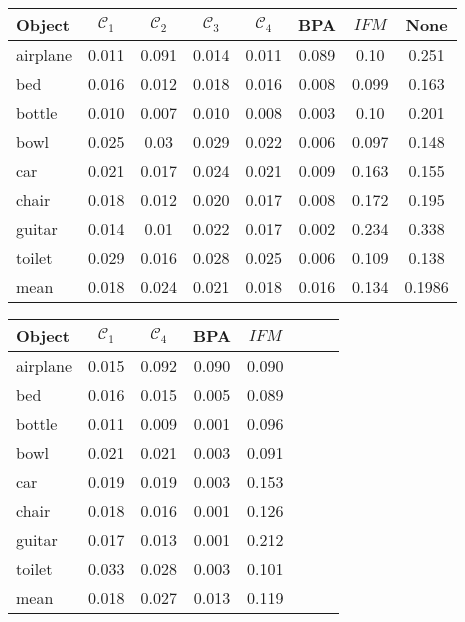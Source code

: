 \begin{center}
     \label{tab:distance1024opt} 
    \begin{tabular}{| l  | c | c | c | c | c | c || c |}
        \hline
        Object& $\mathcal{C}_1$ & $\mathcal{C}_2$ & $\mathcal{C}_3$ & $\mathcal{C}_4$ & BPA & $IFM$ & None\\ \hline
        airplane&0.011&0.091&0.014&0.011&0.089&0.10 & 0.251\\\hline
        bed&0.016&0.012&0.018&0.016&0.008&0.099 & 0.163\\        \hline
        bottle&0.010&0.007&0.010&0.008&0.003&0.10 & 0.201\\        \hline
        bowl&0.025&0.03&0.029&0.022&0.006&0.097& 0.148\\        \hline
        car&0.021&0.017&0.024&0.021&0.009&0.163& 0.155\\        \hline
        chair&0.018&0.012&0.020&0.017&0.008&0.172& 0.195\\        \hline
        guitar&0.014&0.01&0.022&0.017&0.002&0.234 & 0.338\\        \hline
        toilet&0.029&0.016&0.028&0.025&0.006&0.109 & 0.138\\        \hline\hline
        mean&0.018&0.024&0.021&0.018&0.016&0.134 & 0.1986\\        \hline
    \end{tabular}
\end{center}
\begin{center}
     \label{tab:distance7500} 
    \begin{tabular}{| l  | c | c | c | c | c | c | c |}
        \hline
        Object& $\mathcal{C}_1$ & $\mathcal{C}_4$ & BPA & $IFM$  \\ \hline
        airplane&0.015&0.092&0.090&0.090\\\hline
        bed&0.016&0.015&0.005&0.089\\\hline
        bottle&0.011&0.009&0.001&0.096\\\hline
        bowl&0.021&0.021&0.003&0.091\\\hline
        car&0.019&0.019&0.003&0.153\\\hline
        chair&0.018&0.016&0.001&0.126\\\hline
        guitar&0.017&0.013&0.001&0.212\\\hline
        toilet&0.033&0.028&0.003&0.101\\\hline\hline
        mean&0.018&0.027&0.013&0.119\\\hline
    \end{tabular}
\end{center}